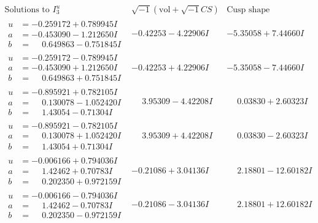 \documentclass[1p]{elsarticle_modified}
\theoremstyle{definition}
\newcommand{\I}{\sqrt{-1}}
\begin{document}
$$\begin{array}{c|c|c}  
\text{Solutions to }I^u_{3}& \I (\text{vol} + \sqrt{-1}CS) & \text{Cusp shape}\\
 \hline 
\begin{aligned}
u &= -0.259172 + 0.789945 I \\
a &= -0.453090 - 1.212650 I \\
b &= \phantom{-}0.649863 - 0.751845 I\end{aligned}
 & -0.42253 - 4.22906 I & -5.35058 + 7.44660 I \\ \hline\begin{aligned}
u &= -0.259172 - 0.789945 I \\
a &= -0.453090 + 1.212650 I \\
b &= \phantom{-}0.649863 + 0.751845 I\end{aligned}
 & -0.42253 + 4.22906 I & -5.35058 - 7.44660 I \\ \hline\begin{aligned}
u &= -0.895921 + 0.782105 I \\
a &= \phantom{-}0.130078 - 1.052420 I \\
b &= \phantom{-}1.43054 - 0.71304 I\end{aligned}
 & \phantom{-}3.95309 - 4.42208 I & \phantom{-}0.03830 + 2.60323 I \\ \hline\begin{aligned}
u &= -0.895921 - 0.782105 I \\
a &= \phantom{-}0.130078 + 1.052420 I \\
b &= \phantom{-}1.43054 + 0.71304 I\end{aligned}
 & \phantom{-}3.95309 + 4.42208 I & \phantom{-}0.03830 - 2.60323 I \\ \hline\begin{aligned}
u &= -0.006166 + 0.794036 I \\
a &= \phantom{-}1.42462 + 0.70783 I \\
b &= \phantom{-}0.202350 + 0.972159 I\end{aligned}
 & -0.21086 + 3.04136 I & \phantom{-}2.18801 - 12.60182 I \\ \hline\begin{aligned}
u &= -0.006166 - 0.794036 I \\
a &= \phantom{-}1.42462 - 0.70783 I \\
b &= \phantom{-}0.202350 - 0.972159 I\end{aligned}
 & -0.21086 - 3.04136 I & \phantom{-}2.18801 + 12.60182 I \\ \hline\begin{aligned}

\end{aligned}
\end{array}$$
\end{document}
